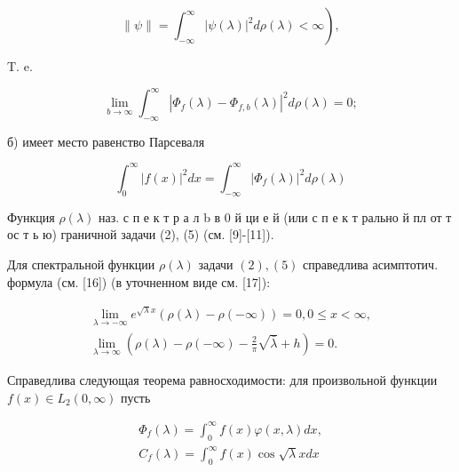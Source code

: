 \documentclass[10pt]{article}
\begin{document}
\[

\left.\|\psi\|=\int_{-\infty}^{\infty}|\psi(\lambda)|^{2} d \rho(\lambda)<\infty\right),

\]



T. e.



\[

\lim _{b \rightarrow \infty} \int_{-\infty}^{\infty}\left|\Phi_{f}(\lambda)-\Phi_{f, b}(\lambda)\right|^{2} d \rho(\lambda)=0 ;

\]



б) имеет место равенство Парсеваля



\[

\int_{0}^{\infty}|f(x)|^{2} d x=\int_{-\infty}^{\infty}\left|\Phi_{f}(\lambda)\right|^{2} d \rho(\lambda)

\]



Функция $\rho(\lambda)$ наз. с п е к т р а л b в 0 й ци е й (или с п е к т рально й пл от т ос т ь ю) граничной задачи (2), (5) (см. [9]-[11]).



Для спектральной функции $\rho(\lambda)$ задачи $(2),(5)$ справедлива асимптотич. формула (см. [16]) (в уточненном виде см. [17]):



\[

\begin{gathered}

\lim _{\lambda \rightarrow-\infty} e^{\sqrt{\lambda} x}(\rho(\lambda)-\rho(-\infty))=0,0 \leqslant x<\infty, \\

\lim _{\lambda \rightarrow \infty}\left(\rho(\lambda)-\rho(-\infty)-\frac{2}{\pi} \sqrt{\bar{\lambda}}+h\right)=0 .

\end{gathered}

\]



Справедлива следующая теорема равносходимости: для произвольной функции $f(x) \in L_{2}(0, \infty)$ пусть



\[

\begin{gathered}

\Phi_{f}(\lambda)=\int_{0}^{\infty} f(x) \varphi(x, \lambda) d x, \\

C_{f}(\lambda)=\int_{0}^{\infty} f(x) \cos \sqrt{\lambda} x d x

\end{gathered}

\]
\end{document}
